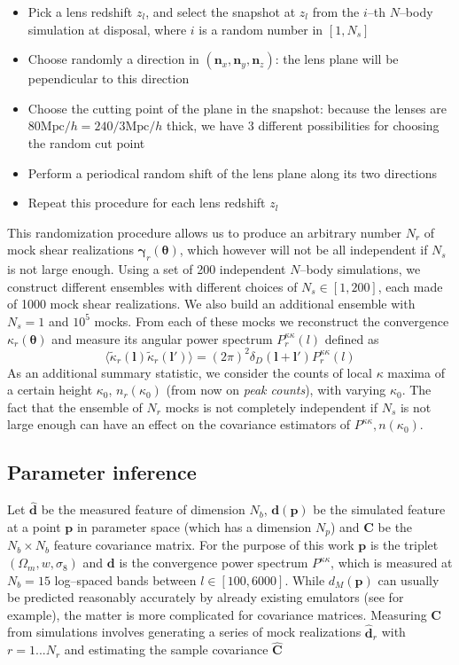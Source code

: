 \documentclass[reprint,aps,prd,superscriptaddress,showkeys,showpacs]{revtex4-1}
\newcommand{\bb}[1]{\mathbf{#1}}
\newcommand{\bbh}[1]{\mathbf{\hat{#1}}}
\begin{document}
\begin{itemize}
\item Pick a lens redshift $z_l$, and select the snapshot at $z_l$ from the $i$--th $N$--body simulation at disposal, where $i$ is a random number in $[1,N_s]$
\item Choose randomly a direction in $(\bb{n}_x,\bb{n}_y,\bb{n}_z)$: the lens plane will be pependicular to this direction
\item Choose the cutting point of the plane in the snapshot: because the lenses are $80\mathrm{Mpc}/h=240/3\mathrm{Mpc}/h$ thick, we have 3 different possibilities for choosing the random cut point
\item Perform a periodical random shift of the lens plane along its two directions
\item Repeat this procedure for each lens redshift $z_l$  
\end{itemize}  
%
This randomization procedure allows us to produce an arbitrary number $N_r$ of mock shear realizations $\pmb{\gamma}_r(\pmb{\theta})$, which however will not be all independent if $N_s$ is not large enough. Using a set of 200 independent $N$--body simulations, we construct different ensembles with different choices of $N_s\in[1,200]$, each made of 1000 mock shear realizations. We also build an additional ensemble with $N_s=1$ and $10^5$ mocks. From each of these mocks we reconstruct the convergence $\kappa_r(\pmb{\theta})$ and measure its angular power spectrum $P^{\kappa\kappa}_r(l)$ defined as
\begin{equation}
\langle\tilde{\kappa}_r(\bb{l})\tilde{\kappa}_r(\bb{l}')\rangle = (2\pi)^2\delta_D(\bb{l}+\bb{l}')P^{\kappa\kappa}_r(l)
\end{equation}
%
As an additional summary statistic, we consider the counts of local $\kappa$ maxima of a certain height $\kappa_0$, $n_r(\kappa_0)$ (from now on \textit{peak counts}), with varying $\kappa_0$. The fact that the ensemble of $N_r$ mocks is not completely independent if $N_s$ is not large enough can have an effect on the covariance estimators of $P^{\kappa\kappa},n(\kappa_0)$. 

\subsection{Parameter inference}
%
Let $\bbh{d}$ be the measured feature of dimension $N_b$, $\bb{d}(\bb{p})$ be the simulated feature at a point $\bb{p}$ in parameter space (which has a dimension $N_p$) and $\bb{C}$ be the $N_b\times N_b$ feature covariance matrix. For the purpose of this work $\bb{p}$ is the triplet $(\Omega_m,w,\sigma_8)$ and $\bb{d}$ is the convergence power spectrum $P^{\kappa\kappa}$, which is measured at $N_b=15$ log--spaced bands between $l\in[100,6000]$. While $d_M(\bb{p})$ can usually be predicted reasonably accurately by already existing emulators (see \citep{coyote2,Nicaea} for example), the matter is more complicated for covariance matrices. Measuring $\bb{C}$ from simulations involves generating a series of mock realizations $\bbh{d}_r$ with $r=1...N_r$ and estimating the sample covariance $\bbh{C}$
\end{document}
